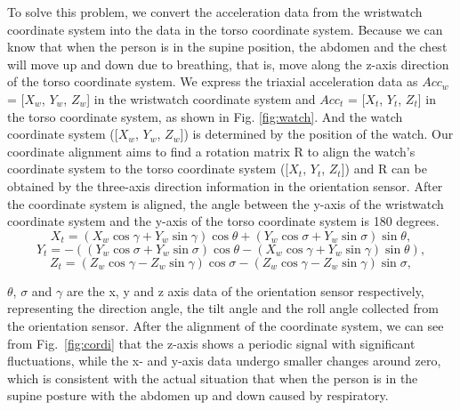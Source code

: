 To solve this problem, we convert the acceleration data from the wristwatch coordinate system into the data in the torso coordinate system. Because we can know that when the person is in the supine position, the abdomen and the chest will move up and down due to breathing, that is, move along the z-axis direction of the torso coordinate system. We express the triaxial acceleration data as $Acc_w$ = [$X_w$, $Y_w$, $Z_w$] in the wristwatch coordinate system and $Acc_t$ = [$X_t$, $Y_t$, $Z_t$] in the torso coordinate system, as shown in Fig. \ref{fig:watch}. And the watch coordinate system ({[$X_w$, $Y_w$, $Z_w$]}) is determined by the position of the watch. Our coordinate alignment aims to find a rotation matrix R to align the watch's coordinate system to the torso coordinate system ({[$X_t$, $Y_t$, $Z_t$]}) and R can be obtained by the three-axis direction information in the orientation sensor. After the coordinate system is aligned, the angle between the y-axis of the wristwatch coordinate system and the y-axis of the torso coordinate system is 180 degrees.
\begin{equation}
      X_t  = (X_w {\cos\gamma} + Y_w{\sin\gamma}){\cos\theta} + (Y_w\cos\sigma + Y_w\sin\sigma)\sin\theta,
\end{equation}
\begin{equation}
      Y_t = -((Y_w\cos\sigma + Y_w\sin\sigma)\cos\theta - (X_w\cos\gamma + Y_w\sin\gamma)\sin\theta),
\end{equation}
\begin{equation}
      Z_t = (Z_w\cos\gamma - Z_w\sin\gamma)\cos\sigma - (Z_w\cos\gamma - Z_w\sin\gamma)\sin\sigma,
\end{equation}

$\theta$, $\sigma$ and $\gamma$ are the x, y and z axis data of the orientation sensor respectively, representing the direction angle, the tilt angle and the roll angle collected from the orientation sensor. After the alignment of the coordinate system, we can see from Fig.~\ref{fig:cordi} that the z-axis shows a periodic signal with significant fluctuations, while the x- and y-axis data undergo smaller changes around zero, which is consistent with the actual situation that when the person is in the supine posture with the abdomen up and down caused by respiratory.


